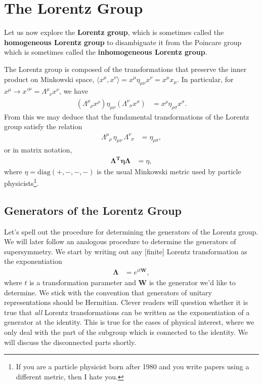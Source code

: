 \documentclass[12pt]{article}
\numberwithin{equation}{section}    %
\begin{document}
\section{The Lorentz Group}

Let us now explore the \textbf{Lorentz group}, which is sometimes called the \textbf{homogeneous Lorentz group} to disambiguate it from the Poincare group which is sometimes called the \textbf{inhomogeneous Lorentz group}.

The Lorentz group is composed of the transformations that preserve the inner product on Minkowski space, $\langle x^\mu,x^\nu\rangle = x^\mu \eta_{\mu\nu}x^\nu = x^\mu x_\mu$. In particular, for $x^\mu \rightarrow x'^\mu = \Lambda^{\mu}_{\phantom\mu\nu}x^\nu$, we have
\begin{align}
	\left(\Lambda^\mu_{\phantom\mu\rho}x^\rho\right) \eta_{\mu\nu} \left(\Lambda^{\nu}_{\phantom\nu\sigma}x^\sigma\right) &= x^\rho \eta_{\rho\sigma}x^\sigma.
\end{align}
From this we may deduce that the fundamental transformations of the Lorentz group satisfy the relation
\begin{align}
		\Lambda^\mu_{\phantom\mu\rho}\, \eta_{\mu\nu}\, \Lambda^{\nu}_{\phantom\nu\sigma} &= \eta_{\rho\sigma},\label{eq:SUSYalg:lorentzgroup:indices}
\end{align}
or in matrix notation,
\begin{align}
	\mathbf{\Lambda^T\eta\Lambda} &= \eta,\label{eq:SUSYalg:lorentzgroup}
\end{align}
where $\eta = \text{diag}(+,-,-,-)$ is the usual Minkowski metric used by particle physicists\footnote{If you are a particle physicist born after 1980 and you write papers using a different metric, then I hate you.}.


\subsection{Generators of the Lorentz Group}

Let's spell out the procedure for determining the generators of the Lorentz group. We will later follow an analogous procedure to determine the generators of supersymmetry. We start by writing out any [finite] Lorentz transformation as the exponentiation
\begin{align}
	\mathbf{\Lambda} &= e^{i t \mathbf{W}},\label{eq:SUSYalg:lorentz:exp}
\end{align}
where $t$ is a transformation parameter and $\mathbf{W}$ is the generator we'd like to determine. We stick with the convention that generators of unitary representations  should be Hermitian. 
%
Clever readers will question whether it is true that \textit{all} Lorentz transformations can be written as the exponentiation of a generator at the identity. This is true for the cases of physical interest, where we only deal with the part of the subgroup which is connected to the identity. We will discuss the disconnected parts shortly.
\end{document}
